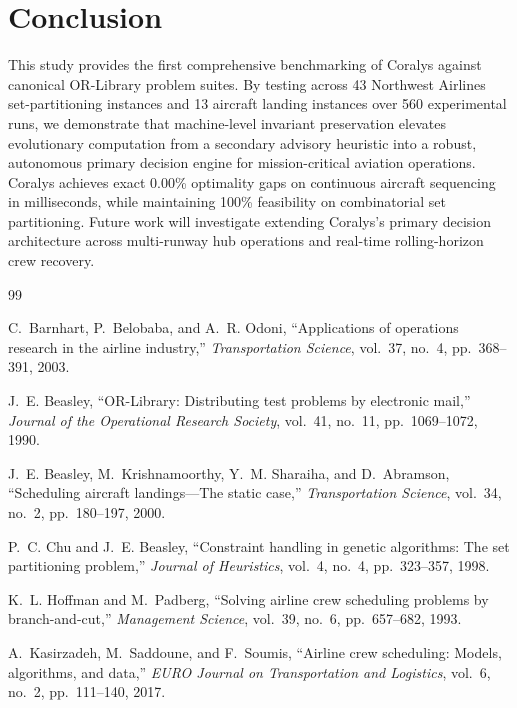 \documentclass[10pt,journal,compsoc]{IEEEtran}
\begin{document}
\section{Conclusion}
\label{sec:conclusion}
This study provides the first comprehensive benchmarking of Coralys against canonical OR-Library problem suites. By testing across 43 Northwest Airlines set-partitioning instances and 13 aircraft landing instances over 560 experimental runs, we demonstrate that machine-level invariant preservation elevates evolutionary computation from a secondary advisory heuristic into a robust, autonomous primary decision engine for mission-critical aviation operations. Coralys achieves exact 0.00\% optimality gaps on continuous aircraft sequencing in milliseconds, while maintaining 100\% feasibility on combinatorial set partitioning. Future work will investigate extending Coralys's primary decision architecture across multi-runway hub operations and real-time rolling-horizon crew recovery.


\begin{thebibliography}{99}

C.~Barnhart, P.~Belobaba, and A.~R. Odoni, ``Applications of operations research in the airline industry,'' \emph{Transportation Science}, vol.~37, no.~4, pp.~368--391, 2003.

J.~E. Beasley, ``OR-Library: Distributing test problems by electronic mail,'' \emph{Journal of the Operational Research Society}, vol.~41, no.~11, pp.~1069--1072, 1990.

J.~E. Beasley, M.~Krishnamoorthy, Y.~M. Sharaiha, and D.~Abramson, ``Scheduling aircraft landings---The static case,'' \emph{Transportation Science}, vol.~34, no.~2, pp.~180--197, 2000.

P.~C. Chu and J.~E. Beasley, ``Constraint handling in genetic algorithms: The set partitioning problem,'' \emph{Journal of Heuristics}, vol.~4, no.~4, pp.~323--357, 1998.

K.~L. Hoffman and M.~Padberg, ``Solving airline crew scheduling problems by branch-and-cut,'' \emph{Management Science}, vol.~39, no.~6, pp.~657--682, 1993.

A.~Kasirzadeh, M.~Saddoune, and F.~Soumis, ``Airline crew scheduling: Models, algorithms, and data,'' \emph{EURO Journal on Transportation and Logistics}, vol.~6, no.~2, pp.~111--140, 2017.

\end{thebibliography}
\end{document}
